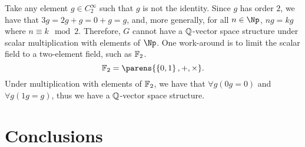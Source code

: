 Take any element $g \in C_2^{\infty}$ such that $g$ is not the identity.
Since $g$ has order $2$, we have that $3g = 2g + g = 0 + g = g$,
and, more generally, for all $n \in \Np$, $ng = k g$ where $n \equiv k \mod 2$.
Therefore, $G$ cannot have a $\mathbb{Q}$-vector space structure under scalar multiplication
with elements of $\Np$.
One work-around is to limit the scalar field to a two-element field,
such as $\mathbb{F}_2$.
\[ \F_2 = \parens{\set{0, 1}, +, \times}. \]
Under multiplication with elements of $\mathbb{F}_2$, we have that
$\forall g (0g = 0)$ and $\forall g (1g = g)$, thus we have a
$\mathbb{Q}$-vector space structure.

\section{Conclusions}~\label{sec:conclusions}



